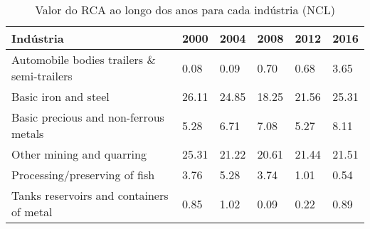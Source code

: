 \begin{table}
\centering
\caption{Valor do RCA ao longo dos anos para cada indústria (NCL)}
\label{tab:ex3-tempo-NCL}
\begin{tabular}{p{6cm}p{1.5cm}p{1.5cm}p{1.5cm}p{1.5cm}p{1.5cm}}
\toprule
                                 Indústria &  2000 &  2004 &  2008 &  2012 &  2016 \\
\midrule
Automobile bodies trailers \& semi-trailers &  0.08 &  0.09 &  0.70 &  0.68 &  3.65 \\
                      Basic iron and steel & 26.11 & 24.85 & 18.25 & 21.56 & 25.31 \\
     Basic precious and non-ferrous metals &  5.28 &  6.71 &  7.08 &  5.27 &  8.11 \\
                 Other mining and quarring & 25.31 & 21.22 & 20.61 & 21.44 & 21.51 \\
             Processing/preserving of fish &  3.76 &  5.28 &  3.74 &  1.01 &  0.54 \\
  Tanks reservoirs and containers of metal &  0.85 &  1.02 &  0.09 &  0.22 &  0.89 \\
\bottomrule
\end{tabular}
\end{table}
